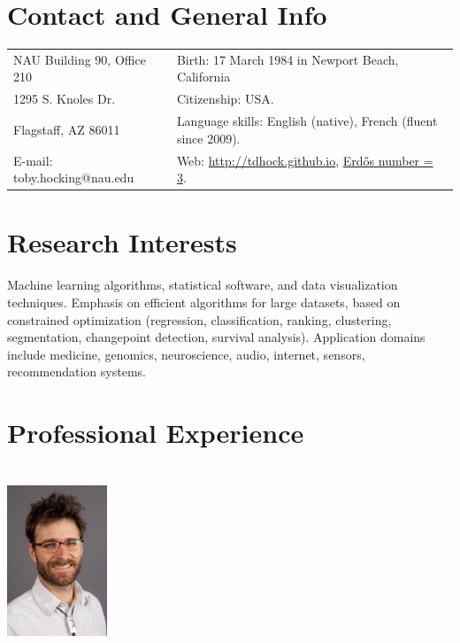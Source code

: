 \documentclass[margin,line]{res}
\begin{document}

\begin{resume}
\section{\sc Contact and General Info}
\vspace{.05in}
\begin{tabular*}{6.1in} {@{\extracolsep{\fill}}ll}
 NAU Building 90, Office 210 & Birth: 17 March 1984 in Newport Beach, California\\
 1295 S. Knoles Dr.  & Citizenship: USA. \\            
  Flagstaff, AZ 86011 & Language skills: English (native), French
                        (fluent since 2009). \\
  E-mail:  toby.hocking@nau.edu & Web: \url{http://tdhock.github.io}, \href{https://tdhock.github.io/blog/2022/erdos-number/}{Erd\H{o}s number = 3}. \\
\end{tabular*}

\section{\sc Research Interests}

Machine learning algorithms, statistical software, and data
visualization techniques. Emphasis on efficient algorithms for large
datasets, based on constrained optimization (regression,
classification, ranking, clustering, segmentation, changepoint
detection, survival analysis). Application domains include medicine,
genomics, neuroscience, audio, internet, sensors, recommendation
systems.

\section{\sc Professional Experience \\ \hspace{0.1cm} \\ \includegraphics[width=3cm]{HOCKING-rectangle-lores.jpg}}


\end{resume}
\end{document}
